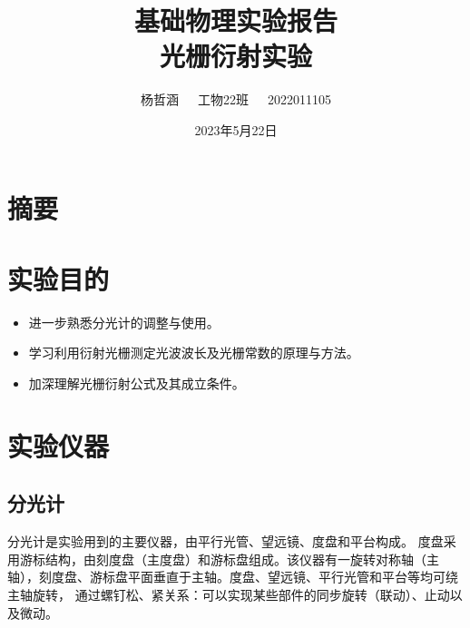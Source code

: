 \documentclass[UTF8,a4paper]{article}%
\title{\fontsize{14pt}{27pt}\selectfont%
    {\heiti%
        基础物理实验报告\\
        光栅衍射实验}}
\author{\fontsize{12pt}{18pt}\selectfont%
    {\kaishu%
    杨哲涵~~~工物22班~~~2022011105}}
\date{2023年5月22日}
\begin{document}
\maketitle
\lhead{}%
\chead{}%
\rhead{}%
\lfoot{}%
\cfoot{\thepage}%
\rfoot{}%
\section*{摘要}
\section{实验目的}
\begin{itemize}
    \item 进一步熟悉分光计的调整与使用。
    \item 学习利用衍射光栅测定光波波长及光栅常数的原理与方法。
    \item 加深理解光栅衍射公式及其成立条件。
\end{itemize}
\section{实验仪器}
\subsection{分光计}
分光计是实验用到的主要仪器，由平行光管、望远镜、度盘和平台构成。
度盘采用游标结构，由刻度盘（主度盘）和游标盘组成。该仪器有一旋转对称轴（主轴），刻度盘、游标盘平面垂直于主轴。度盘、望远镜、平行光管和平台等均可绕主轴旋转，
通过螺钉松、紧关系：可以实现某些部件的同步旋转（联动）、止动以及微动。
\end{document}
